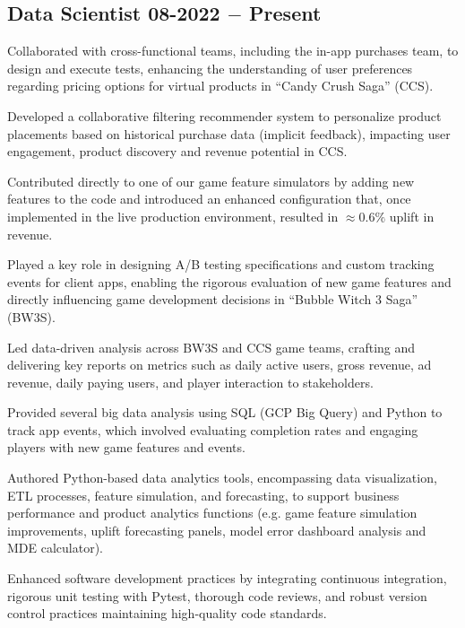 \subsection{{Data Scientist \hfill 08-2022 $-$ Present}}
\begin{zitemize}
\item Collaborated with cross-functional teams, including the in-app purchases team, to design and execute tests, enhancing the understanding of user preferences regarding pricing options for virtual products in ``Candy Crush Saga'' (CCS).
\item Developed a collaborative filtering recommender system to personalize product placements based on historical purchase data (implicit feedback), impacting user engagement, product discovery and revenue potential in CCS.
\item Contributed directly to one of our game feature simulators by adding new features to the code and introduced an enhanced configuration that, once implemented in the live production environment, resulted in  $\approx0.6\%$ uplift in revenue.
\item Played a key role in designing A/B testing specifications and custom tracking events for client apps, enabling the rigorous evaluation of new game features and directly influencing game development decisions in ``Bubble Witch 3 Saga'' (BW3S).
\item Led data-driven analysis across BW3S and CCS game teams, crafting and delivering key reports on metrics such as daily active users, gross revenue, ad revenue, daily paying users, and player interaction to stakeholders.
\item Provided several big data analysis using SQL (GCP Big Query) and Python to track app events, which involved evaluating completion rates and engaging players with new game features and events.
\item Authored Python-based data analytics tools, encompassing data visualization, ETL processes, feature simulation, and forecasting, to support business performance and product analytics functions (e.g. game feature simulation improvements, uplift forecasting panels, model error dashboard analysis and MDE calculator).
\item Enhanced software development practices by integrating continuous integration, rigorous unit testing with Pytest, thorough code reviews, and robust version control practices maintaining high-quality code standards.
\end{zitemize}


